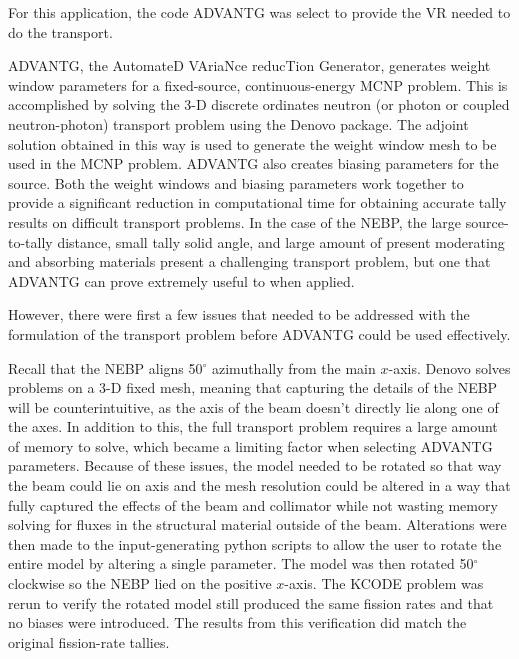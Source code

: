 For this application, the code ADVANTG was select to provide the VR needed to do the transport.

ADVANTG, the AutomateD VAriaNce reducTion Generator, generates weight window parameters for a fixed-source, continuous-energy MCNP problem.
This is accomplished by solving the 3-D discrete ordinates neutron (or photon or coupled neutron-photon) transport problem using the Denovo package.
The adjoint solution obtained in this way is used to generate the weight window mesh to be used in the MCNP problem.
ADVANTG also creates biasing parameters for the source.
Both the weight windows and biasing parameters work together to provide a significant reduction in computational time for obtaining accurate tally results on difficult transport problems.
In the case of the NEBP, the large source-to-tally distance, small tally solid angle, and large amount of present moderating and absorbing materials present a challenging transport problem, but one that ADVANTG can prove extremely useful to when applied.

However, there were first a few issues that needed to be addressed with the formulation of the transport problem before ADVANTG could be used effectively.

Recall that the NEBP aligns 50$^{\circ}$ azimuthally from the main $x$-axis.
Denovo solves problems on a 3-D fixed mesh, meaning that capturing the details of the NEBP will be counterintuitive, as the axis of the beam doesn't directly lie along one of the axes.
In addition to this, the full transport problem requires a large amount of memory to solve, which became a limiting factor when selecting ADVANTG parameters.
Because of these issues, the model needed to be rotated so that way the beam could lie on axis and the mesh resolution could be altered in a way that fully captured the effects of the beam and collimator while not wasting memory solving for fluxes in the structural material outside of the beam.
Alterations were then made to the input-generating python scripts to allow the user to rotate the entire model by altering a single parameter.
The model was then rotated 50$^{\circ}$ clockwise so the NEBP lied on the positive $x$-axis.
The KCODE problem was rerun to verify the rotated model still produced the same fission rates and that no biases were introduced.
The results from this verification did match the original fission-rate tallies.

